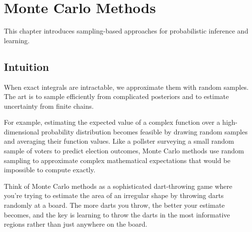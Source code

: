 
\chapter{Monte Carlo Methods}
\label{chap:monte-carlo}

This chapter introduces sampling-based approaches for probabilistic inference and learning.


\begin{learningobjectives}
\end{learningobjectives}



\section*{Intuition}

When exact integrals are intractable, we approximate them with random samples. The art is to sample efficiently from complicated posteriors and to estimate uncertainty from finite chains.

For example, estimating the expected value of a complex function over a high-dimensional probability distribution becomes feasible by drawing random samples and averaging their function values. Like a pollster surveying a small random sample of voters to predict election outcomes, Monte Carlo methods use random sampling to approximate complex mathematical expectations that would be impossible to compute exactly.

Think of Monte Carlo methods as a sophisticated dart-throwing game where you're trying to estimate the area of an irregular shape by throwing darts randomly at a board. The more darts you throw, the better your estimate becomes, and the key is learning to throw the darts in the most informative regions rather than just anywhere on the board.











